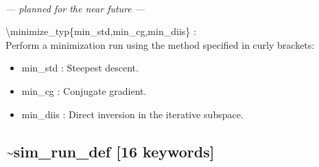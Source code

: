 \documentclass[12pt,titlepage]{article}
\begin{document}
\begin{enumerate}
~\\


 \vspace{0.15in} 
{\it
--- planned for the near future ---
 \item  \textbackslash minimize\_typ\{min\_std,min\_cg,min\_diis\} : \\
     Perform a minimization run using the method specified in curly brackets:
     \begin{itemize}
        \item min\_std : Steepest descent.
        \item min\_cg : Conjugate gradient.
        \item min\_diis : Direct inversion in the 
                                          iterative subspace.
     \end{itemize}
}

\end{enumerate}


\newpage
\subsection*{\bf \~{}sim\_run\_def [16 keywords]}
\end{document}
